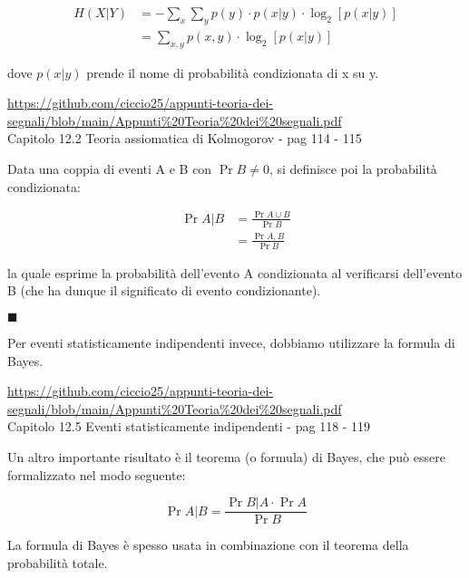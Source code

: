 {
    \Large 
    \begin{equation}
        \begin{split}
            H (X | Y)
            &= 
            -
            \sum_{x}
            \sum_{y}
            p(y) \cdot p (x | y) \cdot \log_{2} \left[ p (x | y )\right] 
            \\
            &= 
            \sum_{x, y} 
            p(x, y) \cdot \log_{2} \left[ p(x | y)\right]
        \end{split}
    \end{equation}
}

dove $p(x | y)$ prende il nome di probabilità condizionata di x su y. \newline 

\begin{tcolorbox}

    \url{https://github.com/ciccio25/appunti-teoria-dei-segnali/blob/main/Appunti%20Teoria%20dei%20segnali.pdf} \\
    Capitolo 12.2 Teoria assiomatica di Kolmogorov - pag 114 - 115 \newline 

    Data una coppia di eventi A e B con $\Pr{B} \neq 0$, si definisce poi la probabilità condizionata: 

{
    \Large 
    \begin{equation}
        \begin{split}
            \Pr{A | B} 
            &= 
            \frac{\Pr{A \cup B}}{\Pr{B}} 
            \\
            &= 
            \frac{\Pr{A, B}}{\Pr{B}}     
        \end{split}
    \end{equation}
} 

la quale esprime la probabilità dell'evento A condizionata al verificarsi dell'evento B (che ha dunque il significato di evento condizionante). \newline 

$\blacksquare$ \newline

Per eventi statisticamente indipendenti invece, dobbiamo utilizzare la formula di Bayes. \newline 

 \url{https://github.com/ciccio25/appunti-teoria-dei-segnali/blob/main/Appunti%20Teoria%20dei%20segnali.pdf} \\
    Capitolo 12.5 Eventi statisticamente indipendenti - pag 118 - 119 \newline 

    Un altro importante risultato è il teorema (o formula) di Bayes, che può essere formalizzato nel modo seguente: 

{
    \Large 
    \begin{equation}
        \Pr{A | B} = \frac{\Pr{B | A} \cdot \Pr{A}}{\Pr{B}}
    \end{equation}
} 

La formula di Bayes è spesso usata in combinazione con il teorema della probabilità totale. \newline 

\end{tcolorbox}

